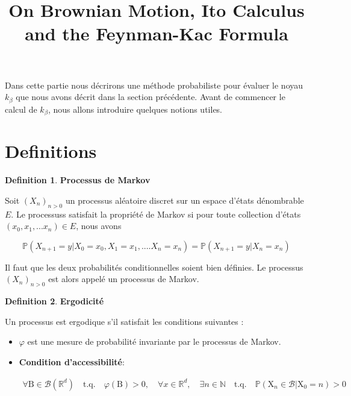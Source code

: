 \documentclass[11pt]{article}
\title{On Brownian Motion, Ito Calculus and the Feynman-Kac Formula}
\theoremstyle{definition}
\newtheorem{definition}{Definition}[section]
\theoremstyle{remark}
\begin{document}
 
\maketitle 

Dans cette partie nous décrirons une méthode probabiliste pour évaluer le noyau $k_{\beta}$ que nous avons décrit dans la section précédente. 
Avant de commencer le calcul de $k_{\beta}$, nous allons introduire quelques notions utiles.

\section{Definitions}

\theoremstyle{definition}

\begin{definition}{\textbf{Processus de Markov}}

Soit $(X_n)_{n >0}$ un processus aléatoire discret sur un espace d'états dénombrable $E$. Le processuss satisfait la propriété de Markov si pour toute collection d'états $(x_0, x_1, ... x_n) \in E$, nous avons 

\begin{equation} 
\mathbb{P}(X_{n+1} = y | X_0 = x_0, X_1 = x_1,....X_n = x_n) = \mathbb{P}(X_{n+1} = y | X_n = x_n)
\end{equation}

Il faut que les deux probabilités conditionnelles soient bien définies. Le processus $(X_n)_{n>0} $ est alors appelé un processus de Markov.

\end{definition}

\begin{definition}{\textbf{Ergodicité}}

Un processus est ergodique s'il satisfait les conditions suivantes :

\begin{itemize}

\item 

$\varphi$ est une mesure de probabilité invariante par le processus de Markov. 

\item 

\textbf{Condition d'accessibilité}: 

\begin{align}
\forall \mathrm{B} \in \mathcal{B}(\mathbb{R}^d)\quad \mathrm{t.q.}\quad \varphi(\mathrm{B})>0, \quad \forall x\in\mathbb{R}^d, \quad \exists n\in\mathbb{N} \quad \mathrm{t.q.}\quad \mathbb{P}(\mathrm{X}_n \in \mathcal{B} | \mathrm{X}_0 =n ) > 0 
\end{align}
\end{itemize}

\end{definition}
\end{document}
